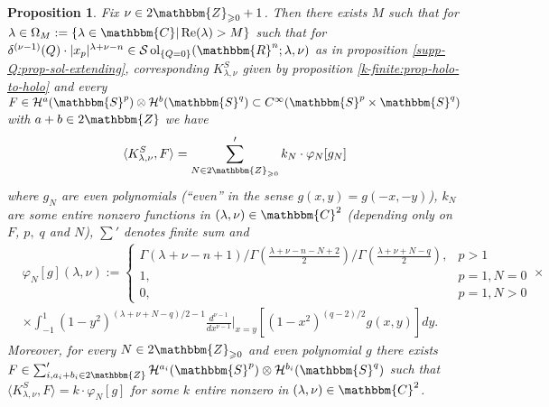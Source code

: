 \documentclass{article}
\newcommand{\assign}{:=}
\newcommand{\tmop}[1]{\ensuremath{\operatorname{#1}}}
\newcommand{\upl}{+}
\numberwithin{definition}{section}
\numberwithin{lemma}{section}
\newtheorem{proposition}{Proposition}
\numberwithin{proposition}{section}
{\theorembodyfont{\rmfamily}\newtheorem{remark}{Remark}
\numberwithin{remark}{section}
}
\begin{document}
\begin{proposition}
  \label{k-finite:prop-KC-hook-kfinite}Fix $\nu \in 2\mathbbm{Z}_{\geqslant 0}
  + 1$. Then there exists $M$ such that for $\lambda \in \Omega_M \assign \{
  \lambda \in \mathbbm{C} | \tmop{Re} ( \lambda) > M \}$ such that for
  $\delta^{( \nu - 1)} ( Q) \cdot | x_p |^{\lambda + \nu - n} \in \mathcal{S}
  \tmop{ol}_{\{ Q = 0 \}} ( \mathbbm{R}^n ; \lambda, \nu)$ as in proposition
  \ref{supp-Q:prop-sol-extending}, corresponding $K^S_{\lambda, \nu}$ given by
  proposition \ref{k-finite:prop-holo-to-holo} and every $F \in \mathcal{H}^a
  ( \mathbbm{S}^p) \otimes \mathcal{H}^b ( \mathbbm{S}^q) \subset C^{\infty} (
  \mathbbm{S}^p \times \mathbbm{S}^q)$ with $a + b \in 2\mathbbm{Z}$ we have
  \begin{equation}
    \langle K^S_{\lambda, \nu}, F \rangle = \sum'_{N \in
    2\mathbbm{Z}_{\geqslant 0}} k_N \cdot \varphi_N [ g_N]
    \label{k-finite:eq-hookC}
  \end{equation}
  where $g_N$ are even polynomials (``even'' in the sense $g ( x, y) = g ( -
  x, - y)$), $k_N$ are some entire nonzero functions in $( \lambda, \nu) \in
  \mathbbm{C}^2$ (depending only on $F$, $p, \; q$ and $N$), $\sum'$ denotes
  finite sum and
  \begin{eqnarray}
    & \varphi_N [ g] ( \lambda, \nu) \assign \left\{ \begin{array}{ll}
      \Gamma ( \lambda + \nu - n + 1) / \Gamma \left( \frac{\lambda + \nu - n
      - N \upl 2}{2} \right) / \Gamma \left( \frac{\lambda + \nu + N - q}{2}
      \right), & p > 1\\
      1, & p = 1, N = 0\\
      0, & p = 1, N > 0
    \end{array} \right. \times &  \nonumber\\
    & \times \int_{- 1}^1 ( 1 - y^2)^{( \lambda + \nu + N - q) / 2 - 1}
    \frac{d^{\nu - 1}}{d x^{\nu - 1}} |_{x = y} [ ( 1 - x^2)^{( q - 2) / 2} g
    ( x, y)] d y. &  \nonumber
  \end{eqnarray}
  Moreover, for every $N \in 2\mathbbm{Z}_{\geqslant 0}$ and even polynomial
  $g$ there exists $F \in \sum_{i, a_i + b_i \in 2\mathbbm{Z}}'
  \mathcal{H}^{a_i} ( \mathbbm{S}^p) \otimes \mathcal{H}^{b_i} (
  \mathbbm{S}^q)$ such that $\langle K_{\lambda, \nu}^S, F \rangle = k \cdot
  \varphi_N [ g]$ for some $k$ entire nonzero in $( \lambda, \nu) \in
  \mathbbm{C}^2$.
\end{proposition}
\end{document}
